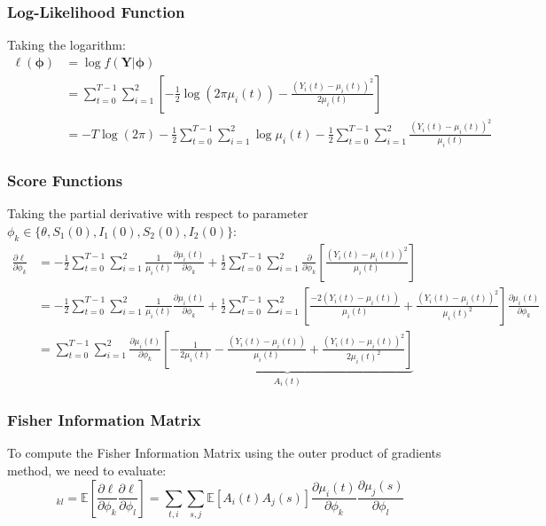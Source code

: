 \subsubsection{Log-Likelihood Function}

Taking the logarithm:
\begin{align}
\ell(\boldsymbol{\phi}) &= \log f(\mathbf{Y}|\boldsymbol{\phi}) \\
&= \sum_{t=0}^{T-1} \sum_{i=1}^{2} \left[-\frac{1}{2}\log(2\pi\mu_i(t)) - \frac{(Y_i(t) - \mu_i(t))^2}{2\mu_i(t)}\right] \\
&= -T\log(2\pi) - \frac{1}{2}\sum_{t=0}^{T-1}\sum_{i=1}^{2} \log\mu_i(t) - \frac{1}{2}\sum_{t=0}^{T-1}\sum_{i=1}^{2} \frac{(Y_i(t) - \mu_i(t))^2}{\mu_i(t)}
\end{align}

\subsubsection{Score Functions}

Taking the partial derivative with respect to parameter $\phi_k \in \{\theta, S_1(0), I_1(0), S_2(0), I_2(0)\}$:
\begin{align}
\frac{\partial \ell}{\partial \phi_k} &= -\frac{1}{2}\sum_{t=0}^{T-1}\sum_{i=1}^{2} \frac{1}{\mu_i(t)} \frac{\partial \mu_i(t)}{\partial \phi_k} + \frac{1}{2}\sum_{t=0}^{T-1}\sum_{i=1}^{2} \frac{\partial}{\partial \phi_k}\left[\frac{(Y_i(t) - \mu_i(t))^2}{\mu_i(t)}\right] \\
&= -\frac{1}{2}\sum_{t=0}^{T-1}\sum_{i=1}^{2} \frac{1}{\mu_i(t)} \frac{\partial \mu_i(t)}{\partial \phi_k} + \frac{1}{2}\sum_{t=0}^{T-1}\sum_{i=1}^{2} \left[\frac{-2(Y_i(t) - \mu_i(t))}{\mu_i(t)} + \frac{(Y_i(t) - \mu_i(t))^2}{\mu_i(t)^2}\right] \frac{\partial \mu_i(t)}{\partial \phi_k} \\
&= \sum_{t=0}^{T-1}\sum_{i=1}^{2} \frac{\partial \mu_i(t)}{\partial \phi_k} \underbrace{\left[-\frac{1}{2\mu_i(t)} - \frac{(Y_i(t) - \mu_i(t))}{\mu_i(t)} + \frac{(Y_i(t) - \mu_i(t))^2}{2\mu_i(t)^2}\right]}_{A_i(t)}
\end{align}

\subsubsection{Fisher Information Matrix}

To compute the Fisher Information Matrix using the outer product of gradients method, we need to evaluate:
\begin{equation}
[\mathbf{J}]_{kl} = \mathbb{E}\left[\frac{\partial \ell}{\partial \phi_k}\frac{\partial \ell}{\partial \phi_l}\right] = \sum_{t,i} \sum_{s,j} \mathbb{E}[A_i(t) A_j(s)] \frac{\partial \mu_i(t)}{\partial \phi_k}\frac{\partial \mu_j(s)}{\partial \phi_l}
\end{equation}

